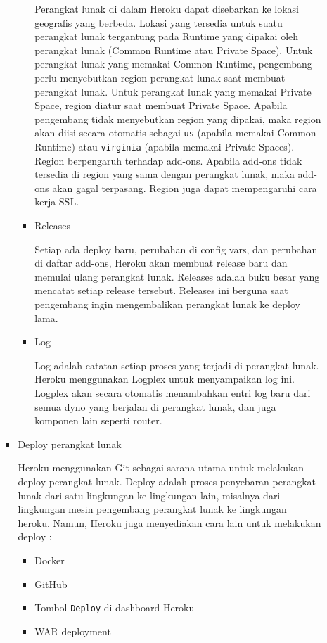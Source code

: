 \documentclass[a4paper,twoside]{article}
\begin{document}
\begin{enumerate}
\begin{itemize}
\begin{itemize}
\begin{itemize}
				Perangkat lunak di dalam Heroku dapat disebarkan ke lokasi geografis yang berbeda. Lokasi yang tersedia untuk suatu perangkat lunak tergantung pada Runtime yang dipakai oleh perangkat lunak (Common Runtime atau Private Space). Untuk perangkat lunak yang memakai Common Runtime, pengembang perlu menyebutkan region perangkat lunak saat membuat perangkat lunak. Untuk perangkat lunak yang memakai Private Space, region diatur saat membuat Private Space. Apabila pengembang tidak menyebutkan region yang dipakai, maka region akan diisi secara otomatis sebagai \texttt{us} (apabila memakai Common Runtime) atau \texttt{virginia} (apabila memakai Private Spaces).
				Region berpengaruh terhadap add-ons. Apabila add-ons tidak tersedia di region yang sama dengan perangkat lunak, maka add-ons akan gagal terpasang. Region juga dapat mempengaruhi cara kerja SSL.
		
				\item Releases
		
				Setiap ada deploy baru, perubahan di config vars, dan perubahan di daftar add-ons, Heroku akan membuat release baru dan memulai ulang perangkat lunak. Releases adalah buku besar yang mencatat setiap release tersebut. Releases ini berguna saat pengembang ingin mengembalikan perangkat lunak ke deploy lama.
		
				\item Log
		
				Log adalah catatan setiap proses yang terjadi di perangkat lunak. Heroku menggunakan Logplex untuk menyampaikan log ini. Logplex akan secara otomatis menambahkan entri log baru dari semua dyno yang berjalan di perangkat lunak, dan juga komponen lain seperti router.
		
			\end{itemize}
		
			\item Deploy perangkat lunak
		
			Heroku menggunakan Git sebagai sarana  utama untuk melakukan deploy perangkat lunak. Deploy adalah proses penyebaran perangkat lunak dari satu lingkungan ke lingkungan lain, misalnya dari lingkungan mesin pengembang perangkat lunak ke lingkungan heroku. Namun, Heroku juga menyediakan cara lain untuk melakukan deploy :
			\begin{itemize}
				\item Docker
				\item GitHub
				\item Tombol \texttt{Deploy} di dashboard Heroku
				\item WAR deployment
			\end{itemize}


\end{itemize}
\end{itemize}
\end{enumerate}
\end{document}
